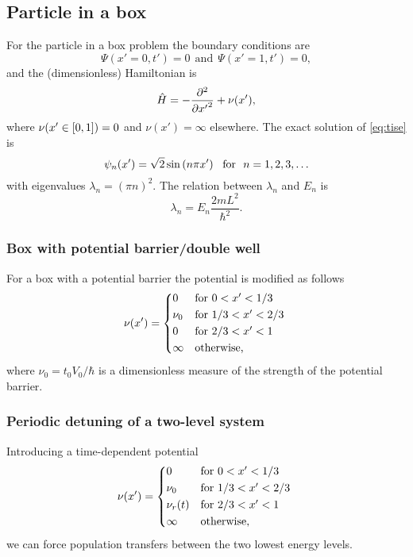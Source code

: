 \subsection*{Particle in a box}
For the particle in a box problem the boundary conditions are
\begin{equation}
    \Psi(x'=0, t') = 0 ~~\text{and}~~ \Psi(x'=1, t') = 0,
\end{equation}
and the (dimensionless) Hamiltonian is 
\begin{equation}
    \hat H = -\pd[2]{}{{x'}} + \nu(x'),
\end{equation}
where $\nu(x'\in \sbr{0, 1}) = 0$ and $\nu(x') = \infty$ elsewhere. The exact solution of \cref{eq:tise} is
\begin{equation}
    \psi_n(x') = \sqrt{2}\sin\del{n\pi x'} ~~\text{for}~~ n=1,2,3,\dots
    \label{eq:exact_eigenfunctions}
\end{equation}
with eigenvalues $\lambda_n = (\pi n)^2$. The relation between $\lambda_n$ and $E_n$ is
\begin{equation}
    \lambda_n = E_n \frac{2mL^2}{\hbar^2}.
\end{equation}

\subsubsection*{Box with potential barrier/double well}
For a box with a potential barrier the potential is modified as follows
\begin{equation}
\nu(x') = 
\begin{cases*}
    0 & for $0 < x' < 1/3$ \\
    \nu_0 & for $1/3 < x' < 2/3$ \\
    0 & for $2/3 < x' < 1$ \\
    \infty & otherwise,
\end{cases*}
\end{equation}
where $\nu_0 = t_0 V_0/\hbar$ is a dimensionless measure of the strength of the potential barrier.

\subsubsection*{Periodic detuning of a two-level system}
Introducing a time-dependent potential
\begin{equation}
\nu(x') = 
\begin{cases*}
    0 & for $0 < x' < 1/3$ \\
    \nu_0 & for $1/3 < x' < 2/3$ \\
    \nu_r(t) & for $2/3 < x' < 1$ \\
    \infty & otherwise,
\end{cases*}
\end{equation}
we can force population transfers between the two lowest energy levels.

